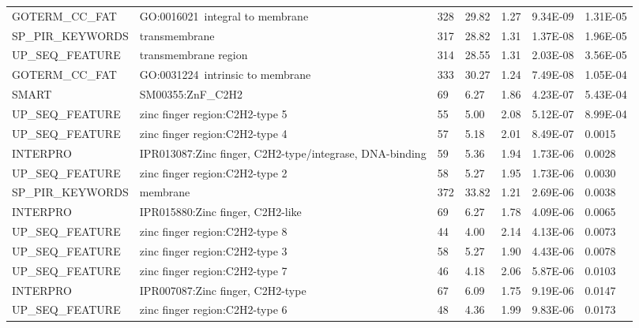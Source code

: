 \documentclass[a4paper,11pt,oneside]{book}
\begin{document}
{\begin{longtable}{lllllll}
GOTERM\_CC\_FAT   & GO:0016021~integral to membrane                                 & 328   & 29.82 & 1.27            & 9.34E-09 & 1.31E-05 \\
SP\_PIR\_KEYWORDS & transmembrane                                                   & 317   & 28.82 & 1.31            & 1.37E-08 & 1.96E-05 \\
UP\_SEQ\_FEATURE  & transmembrane region                                            & 314   & 28.55 & 1.31            & 2.03E-08 & 3.56E-05 \\
GOTERM\_CC\_FAT   & GO:0031224~intrinsic to membrane                                & 333   & 30.27 & 1.24            & 7.49E-08 & 1.05E-04 \\
SMART             & SM00355:ZnF\_C2H2                                               & 69    & 6.27  & 1.86            & 4.23E-07 & 5.43E-04 \\
UP\_SEQ\_FEATURE  & zinc finger region:C2H2-type 5                                  & 55    & 5.00  & 2.08            & 5.12E-07 & 8.99E-04 \\
UP\_SEQ\_FEATURE  & zinc finger region:C2H2-type 4                                  & 57    & 5.18  & 2.01            & 8.49E-07 & 0.0015   \\
INTERPRO          & IPR013087:Zinc finger, C2H2-type/integrase, DNA-binding         & 59    & 5.36  & 1.94            & 1.73E-06 & 0.0028   \\
UP\_SEQ\_FEATURE  & zinc finger region:C2H2-type 2                                  & 58    & 5.27  & 1.95            & 1.73E-06 & 0.0030   \\
SP\_PIR\_KEYWORDS & membrane                                                        & 372   & 33.82 & 1.21            & 2.69E-06 & 0.0038   \\
INTERPRO          & IPR015880:Zinc finger, C2H2-like                                & 69    & 6.27  & 1.78            & 4.09E-06 & 0.0065   \\
UP\_SEQ\_FEATURE  & zinc finger region:C2H2-type 8                                  & 44    & 4.00  & 2.14            & 4.13E-06 & 0.0073   \\
UP\_SEQ\_FEATURE  & zinc finger region:C2H2-type 3                                  & 58    & 5.27  & 1.90            & 4.43E-06 & 0.0078   \\
UP\_SEQ\_FEATURE  & zinc finger region:C2H2-type 7                                  & 46    & 4.18  & 2.06            & 5.87E-06 & 0.0103   \\
INTERPRO          & IPR007087:Zinc finger, C2H2-type                                & 67    & 6.09  & 1.75            & 9.19E-06 & 0.0147   \\
UP\_SEQ\_FEATURE  & zinc finger region:C2H2-type 6                                  & 48    & 4.36  & 1.99            & 9.83E-06 & 0.0173  
\end{longtable}
}
\end{document}
